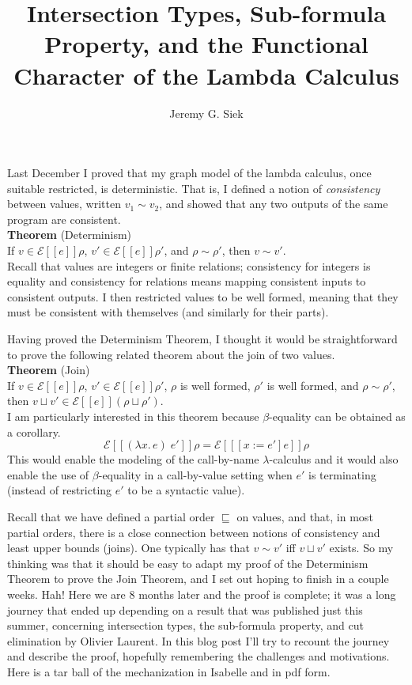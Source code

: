 \documentclass{article}
\title{Intersection Types, Sub-formula Property, and the Functional
  Character of the Lambda Calculus}
\author{Jeremy G. Siek}
\newcommand{\lam}[1]{\lambda #1.\,}
\newcommand{\app}[0]{\;}
\newcommand{\SEM}[1]{[\![ #1 ]\!]}
\newcommand{\ESEM}[1]{\mathcal{E}\SEM{#1}}
\begin{document}
\maketitle

Last December I proved that my graph model of the lambda calculus,
once suitable restricted, is deterministic. That is, I defined a
notion of \emph{consistency} between values, written $v_1 \sim v_2$,
and showed that any two outputs of the same program are consistent. \\

\noindent \textbf{Theorem} (Determinism)\\
  If $v \in \ESEM{e}\rho$, $v' \in \ESEM{e}\rho'$, and $\rho \sim
  \rho'$, then $v \sim v'$. \\

\noindent Recall that values are integers or finite relations;
consistency for integers is equality and consistency for relations
means mapping consistent inputs to consistent outputs. I then
restricted values to be well formed, meaning that they must be
consistent with themselves (and similarly for their parts).


Having proved the Determinism Theorem, I thought it would be
straightforward to prove the following related theorem about the join
of two values. \\

\noindent \textbf{Theorem} (Join)\\
If $v \in \ESEM{e}\rho$, $v' \in \ESEM{e}\rho'$,
$\rho$ is well formed, $\rho'$ is well formed,
and $\rho \sim \rho'$, \\
then $v \sqcup v' \in \ESEM{e}(\rho\sqcup\rho')$. \\

\noindent I am particularly interested in this theorem because
$\beta$-equality can be obtained as a corollary.
\[
\ESEM{(\lam{x}e)\app e'}\rho = \ESEM{[x{:=}e']e}\rho
\]
This would enable the modeling of the call-by-name $\lambda$-calculus
and it would also enable the use of $\beta$-equality in a
call-by-value setting when $e'$ is terminating (instead of restricting
$e'$ to be a syntactic value).


Recall that we have defined a partial order $\sqsubseteq$ on values,
and that, in most partial orders, there is a close connection between
notions of consistency and least upper bounds (joins). One typically
has that $v \sim v'$ iff $v \sqcup v'$ exists. So my thinking was that
it should be easy to adapt my proof of the Determinism Theorem to
prove the Join Theorem, and I set out hoping to finish in a couple
weeks. Hah! Here we are 8 months later and the proof is complete; it
was a long journey that ended up depending on a result that was
published just this summer, concerning intersection types, the
sub-formula property, and cut elimination by Olivier Laurent. In this
blog post I'll try to recount the journey and describe the proof,
hopefully remembering the challenges and motivations.
Here is a tar ball of the mechanization in Isabelle and in pdf form.
\end{document}
